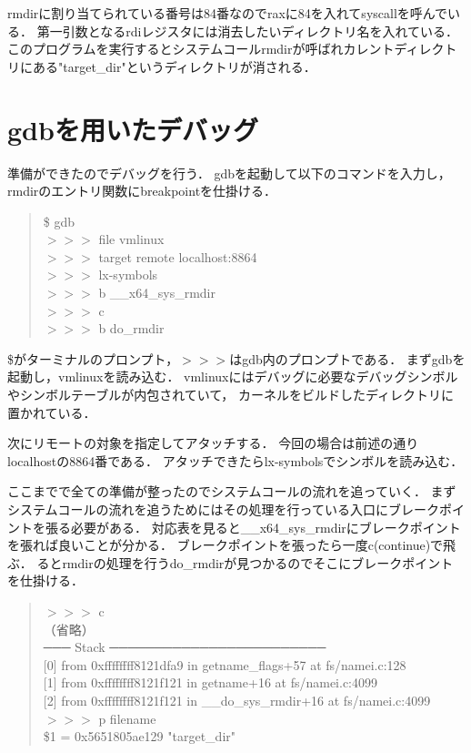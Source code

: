 rmdirに割り当てられている番号は84番\cite{syscall}なのでraxに84を入れてsyscallを呼んでいる．
第一引数となるrdiレジスタには消去したいディレクトリ名を入れている．
このプログラムを実行するとシステムコールrmdirが呼ばれカレントディレクトリにある"target\_dir"というディレクトリが消される．

\section{gdbを用いたデバッグ}
準備ができたのでデバッグを行う．
gdbを起動して以下のコマンドを入力し，rmdirのエントリ関数にbreakpointを仕掛ける．
\begin{quote}
\$ gdb  \\
$>>>$ file vmlinux \\
$>>>$ target remote localhost:8864 \\
$>>>$ lx-symbols \\
$>>>$ b \_\_x64\_sys\_rmdir  \\
$>>>$ c \\
$>>>$ b do\_rmdir 
\end{quote}

\$がターミナルのプロンプト，$>>>$はgdb内のプロンプトである．
まずgdbを起動し，vmlinuxを読み込む．
vmlinuxにはデバッグに必要なデバッグシンボルやシンボルテーブルが内包されていて，
カーネルをビルドしたディレクトリに置かれている．

次にリモートの対象を指定してアタッチする．
今回の場合は前述の通りlocalhostの8864番である．
アタッチできたらlx-symbolsでシンボルを読み込む．

ここまでで全ての準備が整ったのでシステムコールの流れを追っていく．
まずシステムコールの流れを追うためにはその処理を行っている入口にブレークポイントを張る必要がある．
対応表を見ると\_\_x64\_sys\_rmdirにブレークポイントを張れば良いことが分かる．\cite{syscall}
ブレークポイントを張ったら一度c(continue)で飛ぶ．
るとrmdirの処理を行うdo\_rmdirが見つかるのでそこにブレークポイントを仕掛ける．

\begin{quote}
$>>>$ c \\
（省略） \\
─── Stack ──────────────────────── 
\\
{[0]} from 0xffffffff8121dfa9 in getname\_flags+57 at fs/namei.c:128 \\
{[1]} from 0xffffffff8121f121 in getname+16 at fs/namei.c:4099 \\
{[2]} from 0xffffffff8121f121 in \_\_do\_sys\_rmdir+16 at fs/namei.c:4099 \\
$>>>$ p filename \\
\$1 = 0x5651805ae129 "target\_dir"
\end{quote}

